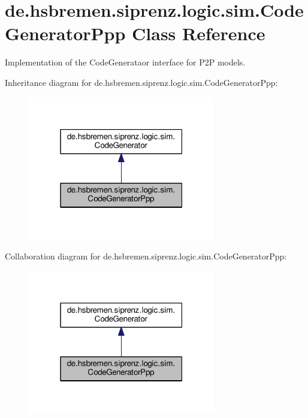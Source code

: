 \hypertarget{classde_1_1hsbremen_1_1siprenz_1_1logic_1_1sim_1_1CodeGeneratorPpp}{}\section{de.\+hsbremen.\+siprenz.\+logic.\+sim.\+Code\+Generator\+Ppp Class Reference}
\label{classde_1_1hsbremen_1_1siprenz_1_1logic_1_1sim_1_1CodeGeneratorPpp}


Implementation of the Code\+Generataor interface for P2P models.  




Inheritance diagram for de.\+hsbremen.\+siprenz.\+logic.\+sim.\+Code\+Generator\+Ppp\+:\nopagebreak
\begin{figure}[H]
\begin{center}
\leavevmode
\includegraphics[width=232pt]{classde_1_1hsbremen_1_1siprenz_1_1logic_1_1sim_1_1CodeGeneratorPpp__inherit__graph}
\end{center}
\end{figure}


Collaboration diagram for de.\+hsbremen.\+siprenz.\+logic.\+sim.\+Code\+Generator\+Ppp\+:\nopagebreak
\begin{figure}[H]
\begin{center}
\leavevmode
\includegraphics[width=232pt]{classde_1_1hsbremen_1_1siprenz_1_1logic_1_1sim_1_1CodeGeneratorPpp__coll__graph}
\end{center}
\end{figure}
